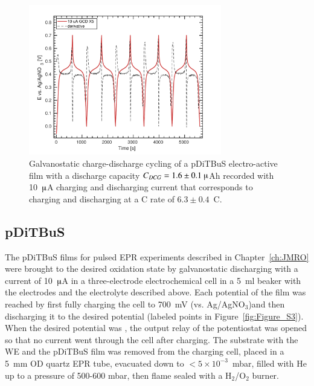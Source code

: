 \begin{figure}[h]
\center
	\includegraphics[width=0.75\textwidth]{./electrochemistry/figures/GCD_pDiTBuS.pdf}
	\caption{Galvanostatic charge-discharge cycling of a pDiTBuS electro-active film with a discharge capacity $C_{DCG}=1.6\pm0.1~\muup$Ah recorded with 10~$\muup$A charging and discharging current that corresponds to charging and discharging at a C rate of $6.3\pm0.4$~C.}
	\label{fig:GCD_DiTBuS}
\end{figure}

\par
\subsection{pDiTBuS}
The pDiTBuS films for pulsed EPR experiments described in Chapter~\ref{ch:JMRO} were brought to the desired oxidation state by galvanostatic discharging with a current of 10~$\muup$A in a three-electrode electrochemical cell in a 5~ml beaker with the electrodes and the electrolyte described above.
Each potential of the film was reached by first fully charging the cell to 700~mV (vs. Ag/AgNO$_3$)and then discharging it to the desired potential (labeled points in Figure~\ref{fig:Figure_S3}). When the desired potential was , the output relay of the potentiostat was opened so that no current went through the cell after charging. The substrate with the WE and the pDiTBuS film was removed from the charging cell, placed in a 5~mm OD quartz EPR tube, evacuated down to $<5\times10^{-3}$~mbar, filled with He up to a pressure of 500-600 mbar, then flame sealed with a H$_2$/O$_2$ burner.

